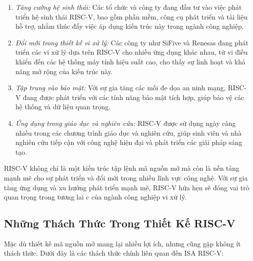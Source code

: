 \begin{enumerate}
    \item \textit{Tăng cường hệ sinh thái:} Các tổ chức và công ty đang đầu tư vào việc phát triển hệ sinh thái RISC-V, bao gồm phần mềm, công cụ phát triển và tài liệu hỗ trợ, nhằm thúc đẩy việc áp dụng kiến trúc này trong ngành công nghiệp.
    \item \textit{Đổi mới trong thiết kế vi xử lý:} Các công ty như SiFive và Renesas đang phát triển các vi xử lý dựa trên RISC-V cho nhiều ứng dụng khác nhau, từ vi điều khiển đến các hệ thống máy tính hiệu suất cao, cho thấy sự linh hoạt và khả năng mở rộng của kiến trúc này.
    \item \textit{Tập trung vào bảo mật:} Với sự gia tăng các mối đe dọa an ninh mạng, RISC-V đang được phát triển với các tính năng bảo mật tích hợp, giúp bảo vệ các hệ thống và dữ liệu quan trọng.
    \item \textit{Ứng dụng trong giáo dục và nghiên cứu:} RISC-V được sử dụng ngày càng nhiều trong các chương trình giáo dục và nghiên cứu, giúp sinh viên và nhà nghiên cứu tiếp cận với công nghệ hiện đại và phát triển các giải pháp sáng tạo.
\end{enumerate}

\noindent RISC-V không chỉ là một kiến trúc tập lệnh mã nguồn mở mà còn là nền tảng mạnh mẽ cho sự phát triển và đổi mới trong nhiều lĩnh 
vực công nghệ. Với sự gia tăng ứng dụng và xu hướng phát triển mạnh mẽ, RISC-V hứa hẹn sẽ đóng vai trò quan trọng trong tương lai c
của ngành công nghiệp vi xử lý.

\subsection{Những Thách Thức Trong Thiết Kế RISC-V}

Mặc dù thiết kế mã nguồn mở mang lại nhiều lợi ích, nhưng cũng gặp không ít thách thức. Dưới đây là các thách thức chính liên quan đến ISA RISC-V:

